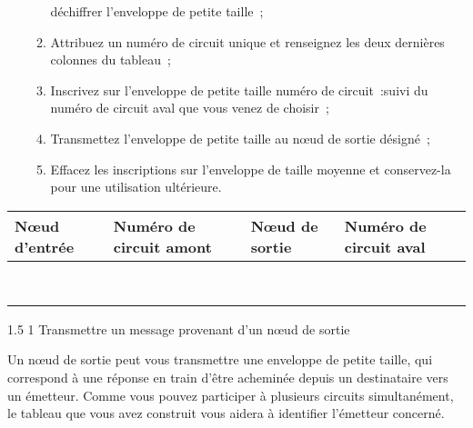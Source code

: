 \documentclass[a4paper,twoside,french]{article}
\makeatletter
\renewcommand\section{\@startsection
  {section}{1}{1cm}%
  {1.5\baselineskip}%
  {1\baselineskip}%
  {\normalfont\Large\bfseries}}%
\makeatother
\begin{document}
\begin{enumerate}
\begin{enumerate}
      déchiffrer l'enveloppe de petite taille~;
    \item Attribuez un numéro de circuit unique et renseignez les deux
      dernières colonnes du tableau~;
    \item Inscrivez sur l'enveloppe de petite taille \og numéro de
      circuit~:\fg suivi du numéro de circuit aval que vous venez de
      choisir~;
    \item Transmettez l'enveloppe de petite taille au n\oe ud de
      sortie désigné~;
    \item Effacez les inscriptions sur l'enveloppe de taille moyenne
      et conservez-la pour une utilisation ultérieure.
    \end{enumerate}
  \end{enumerate}
  \begin{center}
    \begin{tabular}{|m{2.5cm}|m{3.5cm}|m{2.5cm}|m{3.5cm}|}
      \hline
      N\oe ud d'entrée & Numéro de circuit amont &  N\oe ud de sortie & Numéro de circuit aval \\
      \hline
      & & & \\
      & & & \\
      \hline
      & & & \\
      & & & \\
      \hline
      & & & \\
      & & & \\
      \hline
      & & & \\
      & & & \\
      \hline
    \end{tabular}
  \end{center}


  \section{Transmettre un message provenant d'un n\oe ud de sortie}

  Un n\oe ud de sortie peut vous transmettre une enveloppe de
  petite taille, qui correspond à une réponse en train d'être
  acheminée depuis un destinataire vers un émetteur. Comme vous pouvez
  participer à plusieurs circuits simultanément, le tableau que vous
  avez construit vous aidera à identifier l'émetteur concerné.
\end{document}
